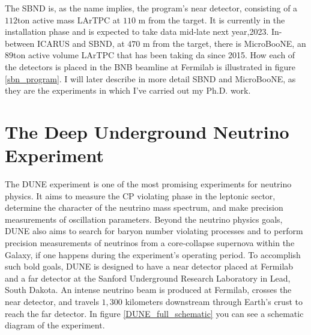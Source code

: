 The SBND is, as the name implies, the program's near detector, consisting of a $112$ton active mass LArTPC at $110$ m from the target. It is currently in the installation phase and is expected to take data mid-late next year,2023. In-between ICARUS and SBND, at $470$ m from the target, there is MicroBooNE, an $89$ton active volume LArTPC that has been taking da since 2015. How each of the detectors is placed in the BNB beamline at Fermilab is illustrated in figure \ref{sbn_program}.
I will later describe in more detail SBND and MicroBooNE, as they are the experiments in which I've carried out my Ph.D. work. 

\section{The Deep Underground Neutrino Experiment}

The DUNE experiment is one of the most promising experiments for neutrino physics. It aims to measure the CP violating phase in the leptonic sector, determine the character of the neutrino mass spectrum, and make precision measurements of oscillation parameters. Beyond the neutrino physics goals, DUNE also aims to search for baryon number violating processes and to perform precision measurements of neutrinos from a core-collapse supernova within the Galaxy, if one happens during the experiment's operating period. 
To accomplish such bold goals, DUNE is designed to have a near detector placed at Fermilab and a far detector at the Sanford Underground Research Laboratory in Lead, South Dakota. An intense neutrino beam is produced at Fermilab, crosses the near detector, and travels $1,300$ kilometers downstream through Earth's crust to reach the far detector. In figure \ref{DUNE_full_schematic} you can see a schematic diagram of the experiment. 

